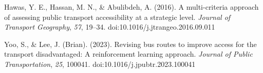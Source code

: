 \documentclass[12pt]{article}
\begin{document}
Hawas, Y. E., Hassan, M. N., \& Abulibdeh, A. (2016). A multi-criteria approach of assessing public transport accessibility at a strategic level. \textit{Journal of Transport Geography}, \textit{57}, 19–34. doi:10.1016/j.jtrangeo.2016.09.011

Yoo, S., \& Lee, J. (Brian). (2023). Revising bus routes to improve access for the transport disadvantaged: A reinforcement learning approach. \textit{Journal of Public Transportation}, \textit{25}, 100041. doi:10.1016/j.jpubtr.2023.100041


\newpage

\begin{appendices}

\end{appendices}
\end{document}
